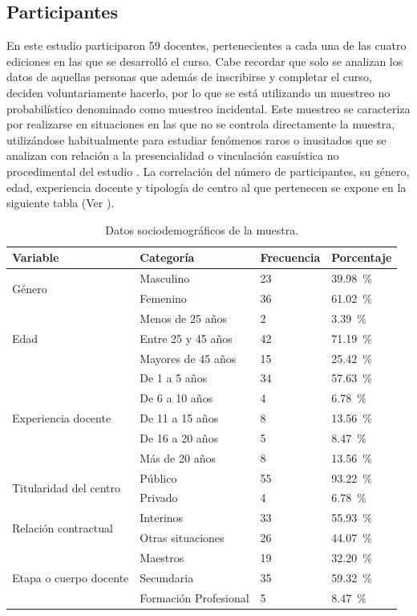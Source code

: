 \documentclass[spanish]{textolivre}
\begin{document}
\subsection{Participantes}\label{sec-organizacao}
En este estudio participaron 59 docentes, pertenecientes a cada una de las cuatro ediciones en las que se desarrolló el curso. Cabe recordar que solo se analizan los datos de aquellas personas que además de inscribirse y completar el curso, deciden voluntariamente hacerlo, por lo que se está utilizando un muestreo no probabilístico denominado como muestreo incidental. Este muestreo se caracteriza por realizarse en situaciones en las que no se controla directamente la muestra, utilizándose habitualmente para estudiar fenómenos raros o inusitados que se analizan con relación a la presencialidad o vinculación casuística no procedimental del estudio \cite{hernandez2019muestreo}. La correlación del número de participantes, su género, edad, experiencia docente y tipología de centro al que pertenecen se expone en la siguiente tabla (Ver ).

\begin{table}[htbp]
\centering
\begin{threeparttable}
\caption{Datos sociodemográficos de la muestra.}
\label{tbl1}
\begin{tabular}{llll}
\toprule
Variable & Categoría & Frecuencia & Porcentaje  \\ 
 \midrule
\multirow{2}{*}{Género} & Masculino & 23 & 39.98~\%  \\ 
& Femenino & 36 & 61.02~\%   \\ 
\multirow{3}{*}{Edad} & Menos de 25 años & 2 & 3.39~\% \\
& Entre 25 y 45 años & 42 & 71.19~\% \\
& Mayores de 45 años & 15 & 25.42~\% \\
\multirow{5}{*}{Experiencia docente} & De 1 a 5 años & 34 & 57.63~\% \\
& De 6 a 10 años & 4 & 6.78~\% \\
& De 11 a 15 años & 8 & 13.56~\% \\
& De 16 a 20 años & 5 & 8.47~\% \\
& Más de 20 años & 8 & 13.56~\% \\
\multirow{2}{*}{Titularidad del centro} & Público & 55 & 93.22~\% \\
& Privado & 4 & 6.78~\% \\
\multirow{2}{*}{Relación contractual} & Interinos & 33 & 55.93~\% \\
& Otras situaciones & 26 & 44.07~\% \\
\multirow{3}{*}{Etapa o cuerpo docente} & Maestros & 19 & 32.20~\% \\
& Secundaria & 35 & 59.32~\% \\
& Formación Profesional & 5 & 8.47~\% \\
\bottomrule
\end{tabular}
\end{threeparttable}
\end{table}
\end{document}
